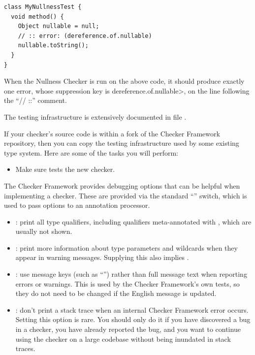\begin{Verbatim}
class MyNullnessTest {
  void method() {
    Object nullable = null;
    // :: error: (dereference.of.nullable)
    nullable.toString();
  }
}
\end{Verbatim}

\noindent
When the Nullness Checker is run on the above code, it should produce
exactly one error, whose suppression key is \<dereference.of.nullable>, on
the line following the ``// ::'' comment.

The testing infrastructure is extensively documented in file .

If your checker's source code is within a fork of the Checker Framework
repository, then you can copy the testing infrastructure used by some
existing type system.  Here are some of the tasks you will perform:

\begin{itemize}

\item Make sure  tests the new checker.
\end{itemize}



The Checker Framework provides debugging options that can be helpful when
implementing a checker. These are provided via the standard  ``''
switch, which is used to pass options to an annotation processor.



\begin{itemize}
\item {}: print all type qualifiers, including
qualifiers meta-annotated with , which are
usually not shown.

\item {}: print more information about type
  parameters and wildcards when they appear in warning messages.  Supplying
  this also implies .

\item {}: use message keys (such as ``'')
rather than full message text when reporting errors or warnings.  This is
used by the Checker Framework's own tests, so they do not need to be
changed if the English message is updated.

\item {}: don't print a stack trace when an
internal Checker Framework error occurs.  Setting this option is rare.  You
should only do it if you have discovered a bug in a checker, you have
already reported the bug, and you want to continue using the checker on a
large codebase without being inundated in stack traces.

\end{itemize}


